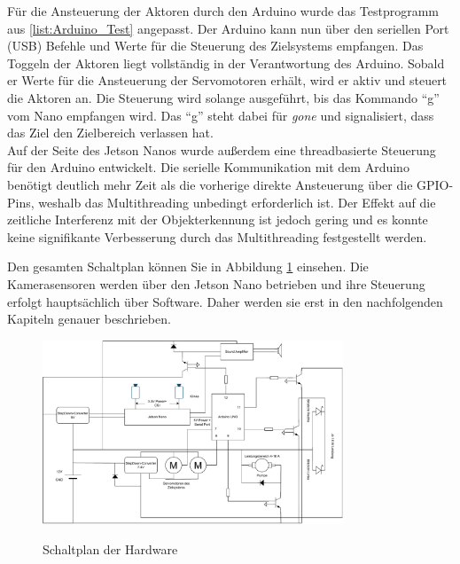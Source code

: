 Für die Ansteuerung der Aktoren durch den Arduino wurde das Testprogramm aus \ref{list:Arduino_Test} angepasst. Der Arduino kann nun über den seriellen Port (USB) Befehle und Werte für die Steuerung des Zielsystems empfangen. Das Toggeln der Aktoren liegt vollständig in der Verantwortung des Arduino. Sobald er Werte für die Ansteuerung der Servomotoren erhält, wird er aktiv und steuert die Aktoren an. Die Steuerung wird solange ausgeführt, bis das Kommando "`g"' vom Nano empfangen wird. Das "`g"' steht dabei für \textit{gone} und signalisiert, dass das Ziel den Zielbereich verlassen hat.
\\
Auf der Seite des Jetson Nanos wurde außerdem eine threadbasierte Steuerung für den Arduino entwickelt. Die serielle Kommunikation mit dem Arduino benötigt deutlich mehr Zeit als die vorherige direkte Ansteuerung über die \ac{GPIO}-Pins, weshalb das Multithreading unbedingt erforderlich ist. Der Effekt auf die zeitliche Interferenz mit der Objekterkennung ist jedoch gering und es konnte keine signifikante Verbesserung durch das Multithreading festgestellt werden.

Den gesamten Schaltplan können Sie in Abbildung \ref{diag:all} einsehen. Die Kamerasensoren werden über den Jetson Nano betrieben und ihre Steuerung erfolgt hauptsächlich über Software. Daher werden sie erst in den nachfolgenden Kapiteln genauer beschrieben.

\begin{figure}[h]
    \centering
    \includegraphics[angle=90,width=0.8\textwidth]{images/Schaltskizzen-Seite-3.drawio.pdf}
    \label{diag:all}
    \caption{Schaltplan der Hardware}
\end{figure}
